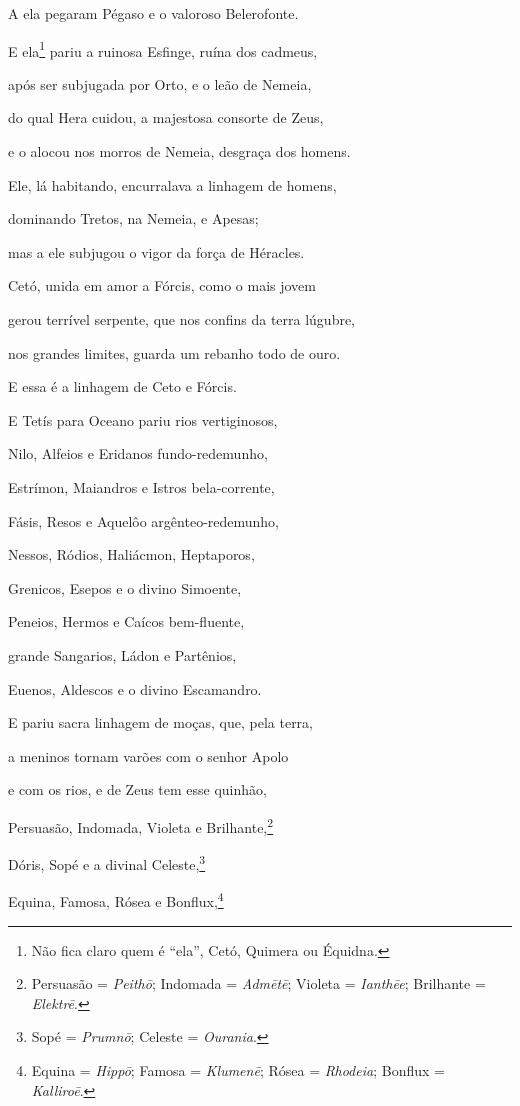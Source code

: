 \begin{pages}
\begin{Rightside}
A ela pegaram Pégaso e o valoroso Belerofonte. 

E ela\footnote{Não fica claro quem é ``ela'', Cetó, Quimera ou Équidna.} pariu a ruinosa Esfinge, ruína dos cadmeus,

após ser subjugada por Orto, e o leão de Nemeia,

do qual Hera cuidou, a majestosa consorte de Zeus,

e o alocou nos morros de Nemeia, desgraça dos homens.

Ele, lá habitando, encurralava a linhagem de homens, 

dominando Tretos, na Nemeia, e Apesas;

mas a ele subjugou o vigor da força de Héracles.

\quad{}Cetó, unida em amor a Fórcis, como o mais jovem

gerou terrível serpente, que nos confins da terra lúgubre,

nos grandes limites, guarda um rebanho todo de ouro. 

\medskip

E essa é a linhagem de Ceto e Fórcis.

E Tetís para Oceano pariu rios vertiginosos,

Nilo, Alfeios e Eridanos fundo-redemunho,

Estrímon, Maiandros e Istros bela-corrente,

Fásis, Resos e Aquelôo argênteo-redemunho, 

Nessos, Ródios, Haliácmon, Heptaporos,

Grenicos, Esepos e o divino Simoente,

Peneios, Hermos e Caícos bem-fluente,

grande Sangarios, Ládon e Partênios,

Euenos, Aldescos e o divino Escamandro. 

E pariu sacra linhagem de moças, que, pela terra,

a meninos tornam varões com o senhor Apolo

e com os rios, e de Zeus tem esse quinhão,

Persuasão, Indomada, Violeta e Brilhante,\footnote{Persuasão = \emph{Peithō}; Indomada = \emph{Admētē}; Violeta = \emph{Ianthēe}; Brilhante = \emph{Elektrē}.}

Dóris, Sopé e a divinal Celeste,\footnote{Sopé = \emph{Prumnō}; Celeste = \emph{Ourania}.} 

Equina, Famosa, Rósea e Bonflux,\footnote{Equina = \emph{Hippō}; Famosa = \emph{Klumenē}; Rósea = \emph{Rhodeia}; Bonflux = \emph{Kalliroē}.}


\end{Rightside}
\end{pages}
